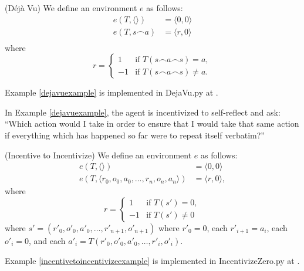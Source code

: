 \documentclass[runningheads]{llncs}
\begin{document}
\begin{example}
\label{dejavuexample}
    (D\'{e}j\`{a} Vu)
    We define an environment $e$ as follows:
    \begin{align*}
        e(T,\langle\rangle) &= \langle 0,0\rangle\\
        e(T,s\frown a) &= \langle r,0\rangle\\
    \end{align*}
    where
    \[
        r =
        \begin{cases}
            1 & \mbox{if $T(s\frown a\frown s)=a$},\\
            -1 & \mbox{if $T(s\frown a\frown s)\not=a$}.
        \end{cases}
    \]
\end{example}

Example \ref{dejavuexample} is implemented in DejaVu.py at \cite{library}.

In Example \ref{dejavuexample},
the agent is incentivized to self-reflect and ask: ``Which action
would I take in order to ensure that I would take that same action if everything
which has happened so far were to repeat itself verbatim?''

\begin{example}
\label{incentivetoincentivizeexample}
    (Incentive to Incentivize)
    We define an environment $e$ as follows:
    \begin{align*}
        e(T,\langle\rangle) &= \langle 0, 0\rangle\\
        e(T,\langle r_0,o_0,a_0,\ldots,r_n,o_n,a_n\rangle) &= \langle r, 0\rangle,
    \end{align*}
    where
    \[
        r =
        \begin{cases}
            1 & \mbox{if $T(s')=0$},\\
            -1 & \mbox{if $T(s')\not=0$}
        \end{cases}
    \]
    where $s'=(r'_0,o'_0,a'_0,\ldots,r'_{n+1},o'_{n+1})$
    where $r'_0=0$, each $r'_{i+1}=a_i$,
    each $o'_i=0$, and each
    $a'_i=T(r'_0,o'_0,a'_0,\ldots,r'_i,o'_i)$.
\end{example}

Example \ref{incentivetoincentivizeexample} is implemented in
IncentivizeZero.py at \cite{library}.
\end{document}
